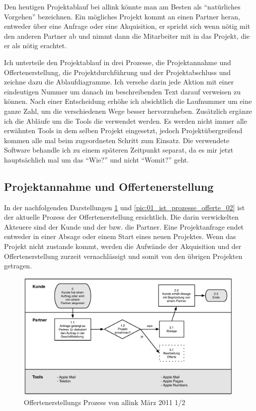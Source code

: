 Den heutigen Projektablauf bei allink könnte man am Besten als ``natürliches Vorgehen''
bezeichnen. Ein mögliches Projekt kommt an einen Partner heran, entweder über 
eine Anfrage oder eine Akquisition, er spricht sich wenn nötig mit den anderen 
Partner ab und nimmt dann die Mitarbeiter mit in das Projekt, die er als nötig erachtet.

Ich unterteile den Projektablauf in drei Prozesse, die Projektannahme und Offertenerstellung,
die Projektdurchführung und der Projektabschluss und zeichne dazu die Ablaufdiagramme.
Ich versehe darin jede Aktion mit einer eindeutigen Nummer um danach im 
beschreibenden Text darauf verweisen zu können. Nach einer Entscheidung erhöhe
ich absichtlich die Laufnummer um eine ganze Zahl, um die verschiedenen Wege
besser hervorzuheben. Zusätzlich ergänze ich die Abläufe um die Tools die
verwendet werden. Es werden nicht immer alle erwähnten Tools in dem selben Projekt eingesetzt,
jedoch Projektübergreifend kommen alle mal beim zugeordneten Schritt zum Einsatz. 
Die verwendete Software behandle ich zu einem späteren Zeitpunkt separat, da es 
mir jetzt hauptsächlich mal um das ``Wie?'' und nicht ``Womit?'' geht.

\subsection{Projektannahme und Offertenerstellung}
In der nachfolgenden Darstellungen \ref{pic:01_ist_prozesse_offerte_01} und
\ref{pic:01_ist_prozesse_offerte_02} ist der
aktuelle Prozess der Offertenerstellung ersichtlich. Die darin verwickelten
Akteuere sind der Kunde und der bzw. die Partner.
Eine Projektanfrage endet entweder in einer Absage oder einem Start eines neuen 
Projektes. Wenn das Projekt nicht zustande kommt, werden die Aufwände der
Akquisition und der Offertenerstellung zurzeit vernachlässigt und somit von
den übrigen Projekten getragen.

\begin{figure}[htbp]
\begin{center}
\includegraphics[width=0.99\textwidth,angle=0]{./bilder/01_ist_prozesse_offerte_01.pdf}
\caption{Offertenerstellungs Prozess von allink März 2011 1/2}
\label{pic:01_ist_prozesse_offerte_01}
\end{center}
\end{figure}

